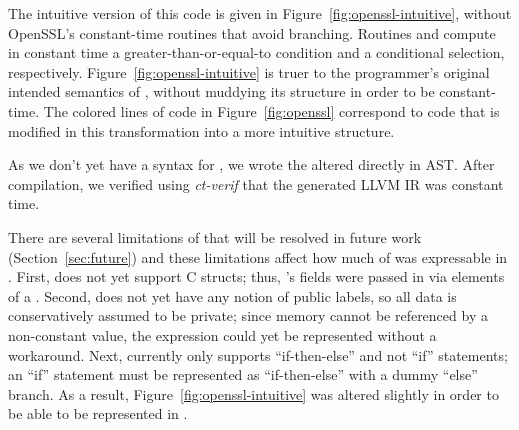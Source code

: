 The intuitive version of this code is given in Figure~\ref{fig:openssl-intuitive}, without OpenSSL's constant-time routines that avoid branching. Routines  and  compute in constant time a greater-than-or-equal-to condition and a conditional selection, respectively. Figure~\ref{fig:openssl-intuitive} is truer to the programmer's original intended semantics of , without muddying its structure in order to be constant-time. The colored lines of code in Figure~\ref{fig:openssl} correspond to code that is modified in this transformation into a more intuitive structure.

As we don't yet have a syntax for \constc, we wrote the altered 
directly in \constc AST. After compilation, we verified using \emph{ct-verif} that the generated LLVM IR was constant time.

There are several limitations of \constc that will be resolved in future work (Section~\ref{sec:future}) and these limitations affect how much of  was expressable in \constc. First, \constc does not yet support C structs; thus, 's fields were passed in via elements of a \bytearray. Second, \constc does not yet have any notion of public labels, so all data is conservatively assumed to be private; since memory cannot be referenced by a non-constant value, the expression  could yet be represented without a workaround. Next, \constc currently only supports ``if-then-else'' and not ``if'' statements; an ``if'' statement must be represented as ``if-then-else'' with a dummy ``else'' branch.
As a result, Figure~\ref{fig:openssl-intuitive} was altered slightly in order to be able to be represented in \constc.
